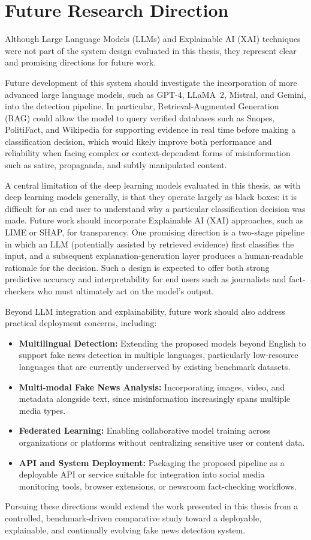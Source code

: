 \section{Future Research Direction}

Although Large Language Models (LLMs) and Explainable AI (XAI) techniques were not part of the system design evaluated in this thesis, they represent clear and promising directions for future work.

Future development of this system should investigate the incorporation of more advanced large language models, such as GPT-4, LLaMA~2, Mistral, and Gemini, into the detection pipeline. In particular, Retrieval-Augmented Generation (RAG) could allow the model to query verified databases such as Snopes, PolitiFact, and Wikipedia for supporting evidence in real time before making a classification decision, which would likely improve both performance and reliability when facing complex or context-dependent forms of misinformation such as satire, propaganda, and subtly manipulated content.

A central limitation of the deep learning models evaluated in this thesis, as with deep learning models generally, is that they operate largely as black boxes: it is difficult for an end user to understand why a particular classification decision was made. Future work should incorporate Explainable AI (XAI) approaches, such as LIME or SHAP, for transparency. One promising direction is a two-stage pipeline in which an LLM (potentially assisted by retrieved evidence) first classifies the input, and a subsequent explanation-generation layer produces a human-readable rationale for the decision. Such a design is expected to offer both strong predictive accuracy and interpretability for end users such as journalists and fact-checkers who must ultimately act on the model's output.

Beyond LLM integration and explainability, future work should also address practical deployment concerns, including:

\begin{itemize}
\item \textbf{Multilingual Detection:} Extending the proposed models beyond English to support fake news detection in multiple languages, particularly low-resource languages that are currently underserved by existing benchmark datasets.
\item \textbf{Multi-modal Fake News Analysis:} Incorporating images, video, and metadata alongside text, since misinformation increasingly spans multiple media types.
\item \textbf{Federated Learning:} Enabling collaborative model training across organizations or platforms without centralizing sensitive user or content data.
\item \textbf{API and System Deployment:} Packaging the proposed pipeline as a deployable API or service suitable for integration into social media monitoring tools, browser extensions, or newsroom fact-checking workflows.
\end{itemize}

Pursuing these directions would extend the work presented in this thesis from a controlled, benchmark-driven comparative study toward a deployable, explainable, and continually evolving fake news detection system.
